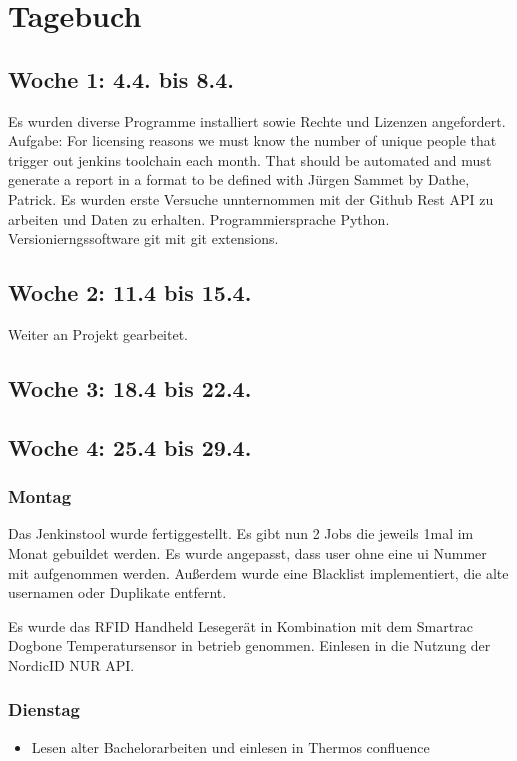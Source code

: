 \chapter{Tagebuch}

\section{Woche 1: 4.4. bis 8.4.}
Es wurden diverse Programme installiert sowie Rechte und Lizenzen angefordert. Aufgabe: For licensing reasons we must know the number of unique people that trigger out jenkins toolchain each month. That should be automated and must generate a report in a format to be defined with Jürgen Sammet by Dathe, Patrick. Es wurden erste Versuche unnternommen mit der Github Rest API zu arbeiten und Daten zu erhalten. Programmiersprache Python. Versionierngssoftware git mit git extensions.

\section{Woche 2: 11.4 bis 15.4.}
Weiter an Projekt gearbeitet. 
\section{Woche 3: 18.4 bis 22.4.}

\section{Woche 4: 25.4 bis 29.4.}
\subsection{Montag}
Das Jenkinstool wurde fertiggestellt. Es gibt nun 2 Jobs die jeweils 1mal im Monat gebuildet werden. Es wurde angepasst, dass user ohne eine ui Nummer mit aufgenommen werden. Außerdem wurde eine Blacklist implementiert, die alte usernamen oder Duplikate entfernt. 

Es wurde das RFID Handheld Lesegerät in Kombination mit dem Smartrac Dogbone Temperatursensor in betrieb genommen. Einlesen in die Nutzung der NordicID NUR API.

\subsection{Dienstag}
\begin{itemize}
	\item Lesen alter Bachelorarbeiten und einlesen in Thermos confluence
\end{itemize}

